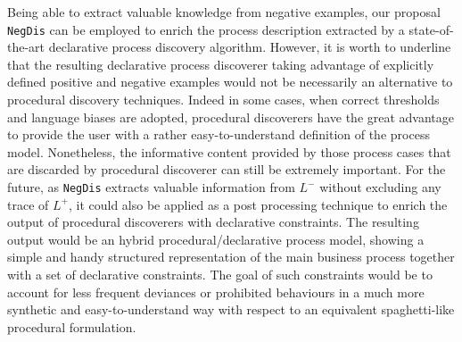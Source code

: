 \documentclass[a4wide,11pt]{article}
\theoremstyle{definition}
\theoremstyle{plain}
\newcommand{\nd}{\texttt{NegDis}\xspace}
\begin{document}
Being able to extract valuable knowledge from negative examples, our proposal \nd can be employed to enrich the process description extracted by a state-of-the-art declarative process discovery algorithm.
However, it is worth to underline that the resulting declarative process discoverer taking advantage of explicitly defined positive and negative examples would not be necessarily an alternative to procedural discovery techniques. 
Indeed in some cases, when correct thresholds and language biases are adopted, procedural discoverers have the great advantage to provide the user with a rather easy-to-understand definition of the process model. Nonetheless, the informative content provided by those process cases that are discarded by procedural discoverer can still be extremely important. 
For the future, as \nd extracts valuable information from $L^-$ without excluding any trace of $L^+$, it could also be applied as a post processing technique to enrich the output of procedural discoverers with declarative constraints.
The resulting output would be an hybrid procedural/declarative process model, showing a simple and handy structured representation of the main business process together with a set of declarative constraints. The goal of such constraints would be to account for less frequent deviances or prohibited behaviours in a much more synthetic and easy-to-understand way with respect to an equivalent spaghetti-like procedural formulation.
\end{document}
